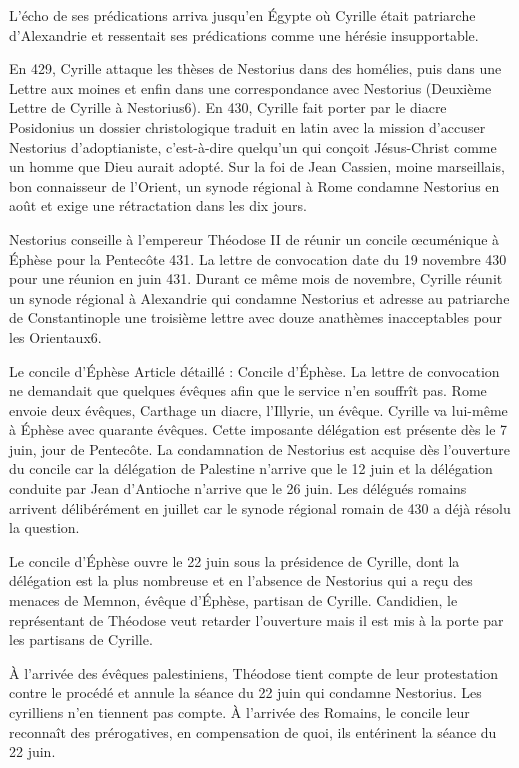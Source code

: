 L'écho de ses prédications arriva jusqu'en Égypte où Cyrille était patriarche d'Alexandrie et ressentait ses prédications comme une hérésie insupportable.

En 429, Cyrille attaque les thèses de Nestorius dans des homélies, puis dans une Lettre aux moines et enfin dans une correspondance avec Nestorius (Deuxième Lettre de Cyrille à Nestorius6). En 430, Cyrille fait porter par le diacre Posidonius un dossier christologique traduit en latin avec la mission d'accuser Nestorius d'adoptianiste, c'est-à-dire quelqu'un qui conçoit Jésus-Christ comme un homme que Dieu aurait adopté. Sur la foi de Jean Cassien, moine marseillais, bon connaisseur de l'Orient, un synode régional à Rome condamne Nestorius en août et exige une rétractation dans les dix jours.

Nestorius conseille à l'empereur Théodose II de réunir un concile œcuménique à Éphèse pour la Pentecôte 431. La lettre de convocation date du 19 novembre 430 pour une réunion en juin 431. Durant ce même mois de novembre, Cyrille réunit un synode régional à Alexandrie qui condamne Nestorius et adresse au patriarche de Constantinople une troisième lettre avec douze anathèmes inacceptables pour les Orientaux6.

Le concile d'Éphèse
Article détaillé : Concile d'Éphèse.
La lettre de convocation ne demandait que quelques évêques afin que le service n'en souffrît pas. Rome envoie deux évêques, Carthage un diacre, l'Illyrie, un évêque. Cyrille va lui-même à Éphèse avec quarante évêques. Cette imposante délégation est présente dès le 7 juin, jour de Pentecôte. La condamnation de Nestorius est acquise dès l'ouverture du concile car la délégation de Palestine n'arrive que le 12 juin et la délégation conduite par Jean d'Antioche n'arrive que le 26 juin. Les délégués romains arrivent délibérément en juillet car le synode régional romain de 430 a déjà résolu la question.

Le concile d'Éphèse ouvre le 22 juin sous la présidence de Cyrille, dont la délégation est la plus nombreuse et en l'absence de Nestorius qui a reçu des menaces de Memnon, évêque d'Éphèse, partisan de Cyrille. Candidien, le représentant de Théodose veut retarder l'ouverture mais il est mis à la porte par les partisans de Cyrille.

À l'arrivée des évêques palestiniens, Théodose tient compte de leur protestation contre le procédé et annule la séance du 22 juin qui condamne Nestorius. Les cyrilliens n'en tiennent pas compte. À l'arrivée des Romains, le concile leur reconnaît des prérogatives, en compensation de quoi, ils entérinent la séance du 22 juin.

